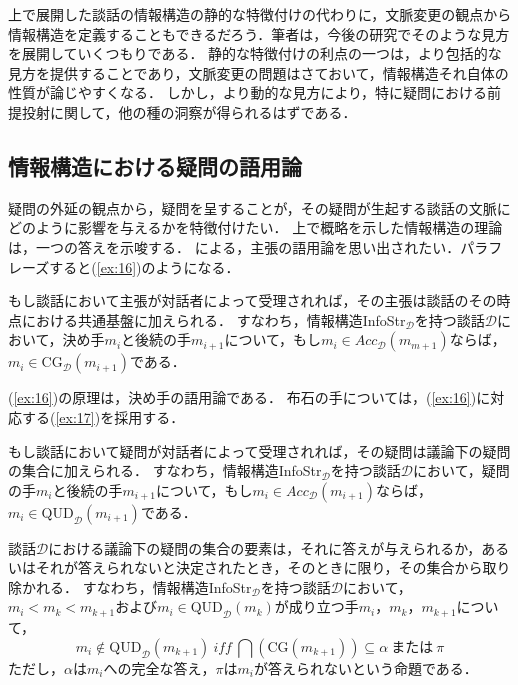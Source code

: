 \documentclass{goken}
\newcommand{\ori}[1]{\noindent\textcolor[gray]{0.7}{\fontsize{8pt}{8pt}\selectfont{\textsf{(p.~#1)}}} }
\begin{document}
上で展開した談話の情報構造の静的な特徴付けの代わりに，文脈変更の観点から情報構造を定義することもできるだろう．筆者は，今後の研究でそのような見方を展開していくつもりである．
静的な特徴付けの利点の一つは，より包括的な見方を提供することであり，文脈変更の問題はさておいて，情報構造それ自体の性質が論じやすくなる．
しかし，より動的な見方により，特に疑問における前提投射に関して，他の種の洞察が得られるはずである．

\ori{22}
\subsection{情報構造における疑問の語用論}\label{sec:1.3}

疑問の外延の観点から，疑問を呈することが，その疑問が生起する談話の文脈にどのように影響を与えるかを特徴付けたい．
上で概略を示した情報構造の理論は，一つの答えを示唆する．
\citet{Stalnaker1978}による，主張の語用論を思い出されたい．パラフレーズすると(\ref{ex:16})のようになる．

\begin{exe}
	\label{ex:16}

	もし談話において主張が対話者によって受理されれば，その主張は談話のその時点における共通基盤に加えられる．
	すなわち，情報構造InfoStr$_{\mathcal{D}}$を持つ談話$\mathcal{D}$において，決め手$m_i$と後続の手$m_{i+1}$について，もし$m_i \in Acc_{\mathcal{D}}(m_{m+1})$ならば，$m_i \in \text{CG}_{\mathcal{D}}(m_{i+1})$である．
\end{exe}

\noindent (\ref{ex:16})の原理は，決め手の語用論である．
布石の手については，(\ref{ex:16})に対応する(\ref{ex:17})を採用する．

\begin{exe}
	\label{ex:17}

	\begin{xlist}
		\item もし談話において疑問が対話者によって受理されれば，その疑問は議論下の疑問の集合に加えられる．
			すなわち，情報構造InfoStr$_{\mathcal{D}}$を持つ談話$\mathcal{D}$において，疑問の手$m_i$と後続の手$m_{i+1}$について，もし$m_i \in Acc_{\mathcal{D}}(m_{i+1})$ならば，$m_i \in \text{QUD}_{\mathcal{D}}(m_{i+1})$である．
		\item 談話$\mathcal{D}$における議論下の疑問の集合の要素は，それに答えが与えられるか，あるいはそれが答えられないと決定されたとき，そのときに限り，その集合から取り除かれる．
			すなわち，情報構造InfoStr$_{\mathcal{D}}$を持つ談話$\mathcal{D}$において，$m_i < m_k < m_{k+1}$および$m_i \in \text{QUD}_{\mathcal{D}}(m_k)$が成り立つ手$m_i$，$m_k$，$m_{k+1}$について，
%
		\[
			m_i \notin \text{QUD}_{\mathcal{D}}(m_{k+1})\ \textit{iff}\ \bigcap (\text{CG}(m_{k+1})) \subseteq \alpha \ \text{または}\ \pi
		\]
%
		ただし，$\alpha$は$m_i$への完全な答え，$\pi$は$m_i$が答えられないという命題である．
	\end{xlist}
\end{exe}
\end{document}
